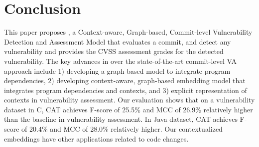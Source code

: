 \section{Conclusion}

This paper proposes {\tool}, a Context-aware, Graph-based,
Commit-level Vulnerability Detection and Assessment Model that
evaluates a commit, and detect any vulnerability and provides the CVSS
assessment grades for the detected vulnerability. The key advances in
{\tool} over the state-of-the-art commit-level VA approach include 1)
developing a graph-based model to integrate program dependencies, 2)
developing context-aware, graph-based embedding model that integrates
program dependencies and contexts, and 3) explicit representation of
contexts in vulnerability assessment. Our evaluation shows
that on a vulnerability dataset in C, CAT achieves F-score of 25.5\%
and MCC of 26.9\% relatively higher than the baseline in
vulnerability assessment. In Java dataset, CAT achieves F-score of
20.4\% and MCC of 28.0\% relatively higher. Our contextualized
embeddings have other applications related to code changes.



















